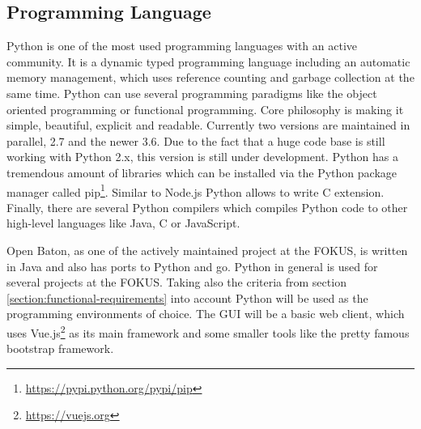 \subsection{Programming Language}
Python is one of the most used programming languages with an active community.\autocite[cf.]{ProgramminLanguage:2017}
It is a dynamic typed programming language including an automatic memory management, which uses reference counting and garbage collection at the same time.\autocite[cf.]{Python:GarbageCollection}
Python can use several programming paradigms like the object oriented programming or functional programming.
Core philosophy is making it simple, beautiful, explicit and readable.
Currently two versions are maintained in parallel, 2.7 and the newer 3.6.
Due to the fact that a huge code base is still working with Python 2.x, this version is still under development.\autocite[cf.]{Peterson:PythonReleaseSchedule}
Python has a tremendous amount of libraries which can be installed via the Python package manager called pip\footnote{\url{https://pypi.python.org/pypi/pip}}.
Similar to Node.js Python allows to write C extension.
Finally, there are several Python compilers which compiles Python code to other high-level languages like Java, C or JavaScript.


Open Baton, as one of the actively maintained project at the \ac{FOKUS}, is written in Java and also has ports to Python and go.
Python in general is used for several projects at the \ac{FOKUS}.
Taking also the criteria from section \ref{section:functional-requirements} into account Python will be used as the  programming environments of choice.
The \ac{GUI} will be a basic web client, which uses Vue.js\footnote{\url{https://vuejs.org}} as its main framework and some smaller tools like the pretty famous bootstrap framework.

